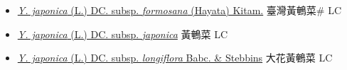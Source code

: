 \begin{itemize}
  \begin{itemize}
        \item[] \href{http://www.theplantlist.org/tpl1.1/search?q=Youngia+japonica+subsp.+formosana}{\textit{Y. japonica} (L.) DC. subsp. \textit{formosana} (Hayata) Kitam.}   臺灣黃鵪菜\# LC
        \item[] \href{http://www.theplantlist.org/tpl1.1/search?q=Youngia+japonica+subsp.+japonica}{\textit{Y. japonica} (L.) DC. subsp. \textit{japonica}}   黃鵪菜 LC
        \item[] \href{http://www.theplantlist.org/tpl1.1/search?q=Youngia+japonica+subsp.+longiflora}{\textit{Y. japonica} (L.) DC. subsp. \textit{longiflora} Babc. \& Stebbins}   大花黃鵪菜 LC
  \end{itemize}
  \end{itemize}
